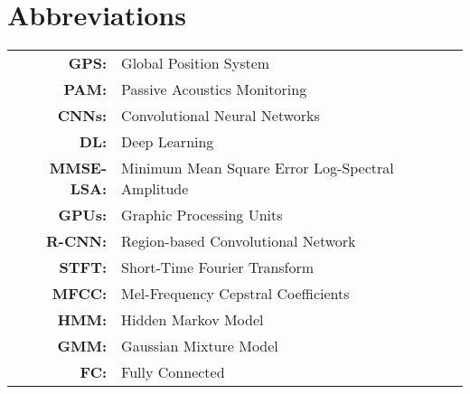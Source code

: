 \renewcommand{\baselinestretch}{1}
\chapter{Abbreviations}

\begin{tabular}{rl}
  \vspace{0.1em} \textbf{GPS:} & Global Position System\\
  \vspace{0.1em} \textbf{PAM:} & Passive Acoustics Monitoring\\ 
  \vspace{0.1em} \textbf{CNNs:} & Convolutional Neural Networks\\
  \vspace{0.1em} \textbf{DL:} & Deep Learning\\
  \vspace{0.1em} \textbf{MMSE-LSA:} & Minimum Mean Square Error Log-Spectral Amplitude\\
  \vspace{0.1em} \textbf{GPUs:} & Graphic Processing Units\\
  \vspace{0.1em} \textbf{R-CNN:} & Region-based Convolutional
  Network\\
  \vspace{0.1em} \textbf{STFT:} & Short-Time Fourier Transform\\
  \vspace{0.1em} \textbf{MFCC:} & Mel-Frequency Cepstral Coefficients\\
  \vspace{0.1em} \textbf{HMM:} & Hidden Markov Model\\
  \vspace{0.1em} \textbf{GMM:} & Gaussian Mixture Model\\
\vspace{0.1em} \textbf{FC:} & Fully Connected\\

\end{tabular}


